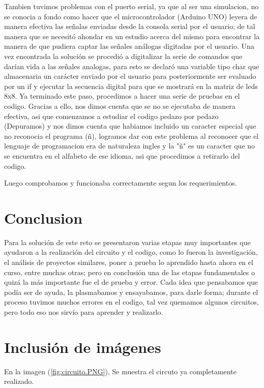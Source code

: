 \documentclass{article}
\begin{document}
Tambien tuvimos problemas con el puerto serial, ya que al ser una simulacion, no se conocia a fondo como hacer que el microcontrolador (Arduino UNO) leyera de manera efectiva las señalas enviadas desde la consola serial por el usuario; de tal manera que se necesitó ahondar en un estudio acerca del mismo para encontrar la manera de que pudiera captar las señales análogas digitadas por el usuario. Una vez encontrada la solución se procedió a digitalizar la serie de comandos que darían vida a las señales analogas, para esto se declaró una variable tipo char que almacenaria un carácter enviado por el usuario para posteriormente ser evaluado por un if y ejecutar la secuencia digital para que se mostrará en la matriz de leds 8x8. 
Ya terminado este paso, procedimos a hacer una serie de pruebas en el codigo. Gracias a ello, nos dimos cuenta que se no se ejecutaba de manera efectiva, asi que comenzamos a estudiar el codigo pedazo por pedazo (Depuramos) y nos dimos cuenta que habiamos incluido un caracter especial que no reconocia el programa (ñ), logramos dar con este problema al reconocer que el lenguaje de programacion era de naturaleza ingles y la "ñ" es un caracter que no se encuentra en el alfabeto de ese idioma, asi que procedimos a retirarlo del codigo. 

Luego comprobamos y funcionaba correctamente segun los requerimientos. 

\section{Conclusion} \label{Conclusion}
Para la solución de este reto se presentaron varias etapas muy importantes que ayudaron a la realización del circuito y el codigo, como lo fueron la investigación, el análisis de proyectos similares, poner a prueba lo aprendido hasta ahora en el curso, entre muchas otras; pero en conclusión una de las etapas fundamentales o quizá la más importante fue el de prueba y error. Cada idea que pensabamos que podía ser de ayuda, la plasmabamos 
y ensayabamos, para darle forma; durante el proceso tuvimos muchos errores en el codigo,
tal vez quemamos algunos circuitos, pero todo eso nos sirvío para aprender y realizarlo. 
\section{Inclusión de imágenes} \label{images}
En la imagen (\ref{fig:circuito.PNG}), Se muestra el circuto ya completamente realizado.
\end{document}
